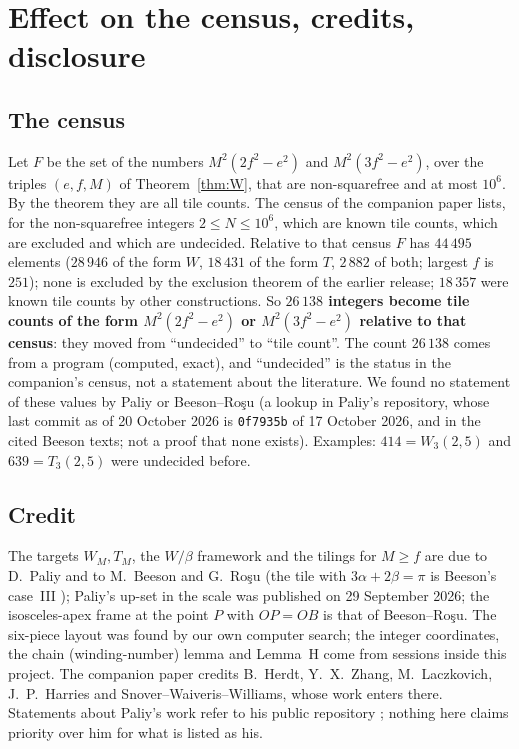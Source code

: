 \documentclass[11pt,reqno]{amsart}
\theoremstyle{plain}
\theoremstyle{definition}
\begin{document}
\section{Effect on the census, credits, disclosure}\label{sec:credit}
\subsection{The census}\label{sec:census}
Let $F$ be the set of the numbers $M^2(2f^2-e^2)$ and $M^2(3f^2-e^2)$, over the triples $(e,f,M)$ of Theorem~\ref{thm:W}, that are non-squarefree and at most $10^6$. By the theorem they are all tile counts. The census of the companion paper \cite{Companion} lists, for the non-squarefree integers $2\le N\le10^6$, which are known tile counts, which are excluded and which are undecided. Relative to that census $F$ has $44\,495$ elements ($28\,946$ of the form $W$, $18\,431$ of the form $T$, $2\,882$ of both; largest $f$ is $251$); none is excluded by the exclusion theorem of the earlier release; $18\,357$ were known tile counts by other constructions. So \textbf{$26\,138$ integers become tile counts of the form $M^2(2f^2-e^2)$ or $M^2(3f^2-e^2)$ relative to that census}: they moved from ``undecided'' to ``tile count''. The count $26\,138$ comes from a program (computed, exact), and ``undecided'' is the status in the companion's census, not a statement about the literature. We found no statement of these values by Paliy or Beeson--Ro\c{s}u (a lookup in Paliy's repository, whose last commit as of 20 October 2026 is \texttt{0f7935b} of 17 October 2026, and in the cited Beeson texts; not a proof that none exists). Examples: $414=W_3(2,5)$ and $639=T_3(2,5)$ were undecided before.

\subsection{Credit}
The targets $W_M,T_M$, the $W/\beta$ framework and the tilings for $M\ge f$ are due to D.~Paliy and to M.~Beeson and G.~Ro\c{s}u \cite{BeesonRosu} (the tile with $3\alpha+2\beta=\pi$ is Beeson's case~III \cite{BeesonIII}); Paliy's up-set in the scale was published on 29 September 2026; the isosceles-apex frame at the point $P$ with $OP=OB$ is that of Beeson--Ro\c{s}u. The six-piece layout was found by our own computer search; the integer coordinates, the chain (winding-number) lemma and Lemma~H come from sessions inside this project. The companion paper \cite{Companion} credits B.~Herdt, Y.~X.~Zhang, M.~Laczkovich, J.~P.~Harries and Snover--Waiveris--Williams, whose work enters there. Statements about Paliy's work refer to his public repository \cite{PaliyRepo}; nothing here claims priority over him for what is listed as his.
\end{document}
